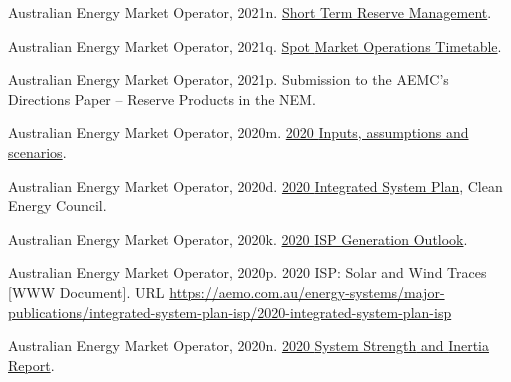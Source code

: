 \documentclass[12pt,a4paper,]{report}
\newlength{\cslhangindent}
\newenvironment{CSLReferences}[2] %
 {%
  \setlength{\parindent}{0pt}
  \ifodd #1 \everypar{\setlength{\hangindent}{\cslhangindent}}\ignorespaces\fi
  \ifnum #2 > 0
  \setlength{\parskip}{#2\baselineskip}
  \fi
 }%
 {}
\begin{document}
\begin{CSLReferences}{1}{0}
\leavevmode{}%
Australian Energy Market Operator, 2021n.
\href{https://aemo.com.au/-/media/files/electricity/nem/security_and_reliability/power_system_ops/procedures/so_op_3703-short-term-reserve-management.pdf?la=en}{Short
{Term Reserve Management}}.

\leavevmode{}%
Australian Energy Market Operator, 2021q.
\href{https://www.aemo.com.au/-/media/Files/Electricity/NEM/Security_and_Reliability/Dispatch/Spot-Market-Operations-Timetable.pdf}{Spot
{Market Operations Timetable}}.

\leavevmode{}%
Australian Energy Market Operator, 2021p. Submission to the {AEMC}'s
{Directions Paper} -- {Reserve Products} in the {NEM}.

\leavevmode{}%
Australian Energy Market Operator, 2020m.
\href{https://aemo.com.au/-/media/files/electricity/nem/planning_and_forecasting/inputs-assumptions-methodologies/2020/2020-inputs-and-assumptions-workbook-dec20.xlsx?la=en}{2020
{Inputs}, assumptions and scenarios}.

\leavevmode{}%
Australian Energy Market Operator, 2020d.
\href{https://aemo.com.au/energy-systems/major-publications/integrated-system-plan-isp/2020-integrated-system-plan-isp}{2020
{Integrated System Plan}}, Clean Energy Council.

\leavevmode{}%
Australian Energy Market Operator, 2020k.
\href{https://aemo.com.au/-/media/files/major-publications/isp/2020/final-2020-isp-generation-outlook.zip?la=en}{2020
{ISP Generation Outlook}}.

\leavevmode{}%
Australian Energy Market Operator, 2020p. 2020 {ISP}: {Solar} and {Wind
Traces} {[}WWW Document{]}. URL
\url{https://aemo.com.au/energy-systems/major-publications/integrated-system-plan-isp/2020-integrated-system-plan-isp}

\leavevmode{}%
Australian Energy Market Operator, 2020n.
\href{https://www.aemo.com.au/-/media/files/electricity/nem/planning_and_forecasting/Operability/2020/2020-System-Strength-and-Inertia-Report\#:~:text=previously\%20declared\%20system\%20strength\%20and\%20inertia\%20shortfalls&text=The\%20inertia\%20requirements\%20include\%20the,when\%20a\%20reg}{2020
{System Strength} and {Inertia Report}}.


\end{CSLReferences}
\end{document}
